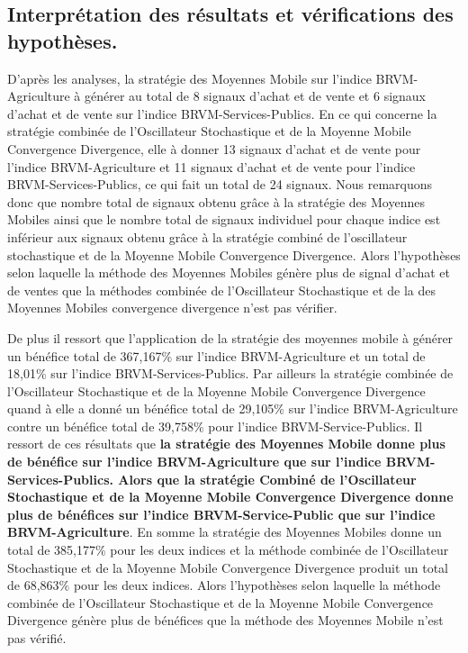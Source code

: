 \subsection{{Interprétation des résultats et vérifications des hypothèses.}}

D'après les analyses, la stratégie des Moyennes Mobile sur l'indice BRVM-Agriculture à 
générer au total de 8 signaux d'achat et de vente et 6 signaux d'achat et de vente 
sur l'indice BRVM-Services-Publics. En ce qui concerne la stratégie
combinée de l'Oscillateur Stochastique et de la Moyenne Mobile Convergence Divergence, 
elle à donner 13 signaux d'achat et de vente pour l'indice BRVM-Agriculture et 
11 signaux d'achat et de vente pour l'indice BRVM-Services-Publics, ce qui fait un total
de 24 signaux. Nous remarquons donc que nombre total de signaux obtenu grâce 
à la stratégie des Moyennes Mobiles ainsi que le nombre total de signaux individuel pour 
chaque indice est inférieur aux signaux obtenu grâce à la stratégie combiné de l'oscillateur
stochastique et de la Moyenne Mobile Convergence Divergence. Alors l'hypothèses selon laquelle 
la méthode des Moyennes Mobiles génère plus de signal d'achat et de ventes que la méthodes
combinée de l'Oscillateur Stochastique et de la des Moyennes Mobiles convergence divergence 
n'est pas vérifier.

De plus il ressort que l'application de la stratégie des moyennes 
mobile à générer un bénéfice total de 367,167\% sur l'indice BRVM-Agriculture et 
un total de 18,01\% sur l'indice BRVM-Services-Publics. Par ailleurs la stratégie 
combinée de l'Oscillateur Stochastique et de la Moyenne Mobile Convergence Divergence
quand à elle a donné un bénéfice total de 29,105\% sur l'indice BRVM-Agriculture 
contre un bénéfice total de 39,758\% pour l'indice BRVM-Service-Publics. 
Il ressort de ces résultats que \textbf{la stratégie des Moyennes Mobile donne plus de 
bénéfice sur l'indice BRVM-Agriculture que sur l'indice BRVM-Services-Publics. 
Alors que la stratégie Combiné de l'Oscillateur Stochastique et de la 
Moyenne Mobile Convergence Divergence donne plus de bénéfices sur 
l'indice BRVM-Service-Public que sur l'indice BRVM-Agriculture}. En somme 
la stratégie des Moyennes Mobiles donne un total de 385,177\% pour les deux indices 
et la méthode combinée de l'Oscillateur Stochastique et de la Moyenne Mobile Convergence Divergence
produit un total de 68,863\% pour les deux indices. Alors l'hypothèses selon laquelle
la  méthode combinée de l'Oscillateur Stochastique et de la Moyenne Mobile Convergence Divergence
génère plus de bénéfices que la méthode des Moyennes Mobile n'est pas vérifié.

